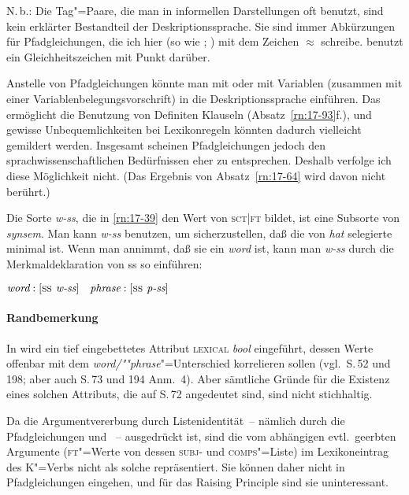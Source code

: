 \documentclass[output=paper]{LSP/langsci}
\begin{document}
\randnum\label{rn:17-40} N.\,b.: Die Tag"=Paare, die man in informellen Darstellungen oft benutzt,
sind kein erklärter Bestandteil der Deskriptionssprache. Sie sind
immer Abkürzungen für Pfadgleichungen, die ich hier (so wie \citealt[29]{king1992a}; \citealt[9]{king1994a}) mit dem Zeichen $\approx$ schreibe. \citet[52f.]{Carpenter92a} benutzt
ein Gleichheitszeichen mit Punkt darüber.

\randnum\label{rn:17-41}Anstelle von Pfadgleichungen könnte man mit
\citet[19f. (3)]{PollardSag1994} oder mit \citet[Kapitel~10]{Carpenter92a} Variablen
(zusammen mit einer Variablenbelegungsvorschrift) in die
Deskriptionssprache einführen. Das ermöglicht die Benutzung von
Definiten Klauseln (Absatz~\ref{rn:17-93}f.), und gewisse Unbequemlichkeiten bei
Lexikonregeln könnten dadurch vielleicht gemildert werden. Insgesamt
scheinen Pfadgleichungen jedoch den sprachwissenschaftlichen
Bedürfnissen eher zu entsprechen. Deshalb verfolge ich diese
Möglichkeit nicht. (Das Ergebnis von Absatz~\ref{rn:17-64} wird davon nicht
berührt.)

\randnum\label{rn:17-42}Die Sorte \textit{w-ss}, die in \eqref{rn:17-39} den Wert von \textsc{sct}|\textsc{ft} bildet, ist eine
Subsorte von \textit{synsem}. Man kann \textit{w-ss} benutzen, um sicherzustellen, daß
die von \textit{hat} selegierte  minimal ist. Wenn man
\zb annimmt, daß sie ein \textit{word} ist, kann man \textit{w-ss} durch die
Merkmaldeklaration von ss so einführen:
\begin{exe}
\ex
$\textit{word}: [\textsc{ss} \textit{ w-ss}] \quad \textit{phrase}:
[\textsc{ss}   \textit{ p-ss}]$
\end{exe}

\paragraph*{Randbemerkung}\randnum\label{rn:17-43} In \citet{PollardSag1987} wird ein tief eingebettetes Attribut
\textsc{lexical} \textit{bool} eingeführt, dessen Werte offenbar mit dem
\textit{word/""phrase}"=Unterschied korrelieren sollen (vgl.\ S.\,52 und 198; aber
auch S.\,73 und 194 Anm.~4). Aber sämtliche Gründe für die Existenz
eines solchen Attributs, die auf S.\,72 angedeutet sind, sind nicht
stichhaltig.

\randnum\label{rn:17-44}Da die Argumentvererbung durch Listenidentität~-- nämlich durch die
Pfadgleichungen  und ~-- ausgedrückt ist, sind die vom abhängigen
 evtl.\ geerbten Argumente
(\dash \textsc{ft}"=Werte von dessen \textsc{subj}- und
\textsc{comps}"=Liste) im Lexikoneintrag des K"=Verbs nicht
als solche repräsentiert. Sie können daher nicht in Pfadgleichungen
eingehen, und für das Raising Principle sind sie uninteressant.
\end{document}
